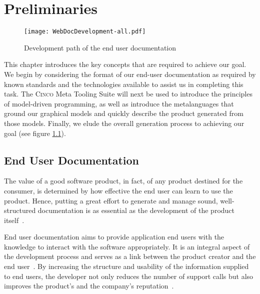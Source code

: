 
\chapter{Preliminaries}\label{ch:Basis}

\begin{figure}[t]
    \centering
    \texttt{[image: WebDocDevelopment-all.pdf]}
    \caption{Development path of the end user documentation}
    \label{fig:procWorkflow}
\end{figure}

This chapter introduces the key concepts that are required to achieve our goal. We begin by considering the format of our end-user documentation as required by known standards and the technologies available to assist us in completing this task. The \textsc{Cinco} Meta Tooling Suite will next be used to introduce the principles of model-driven programming, as well as introduce the metalanguages that ground our graphical models and quickly describe the product generated from those models. Finally, we elude the overall generation process to achieving our goal (see figure \ref{fig:procWorkflow}).

\pagebreak

\section{End User Documentation}\label{sec:endUserDoc}

The value of a good software product, in fact, of any product destined for the consumer, is determined by how effective the end user can learn to use the product. Hence, putting a great effort to generate and manage sound, well-structured documentation is as essential as the development of the product itself~\cite{ISO-IEC-IEEE}. 

End user documentation aims to provide application end users with the knowledge to interact with the software appropriately. It is an integral aspect of the development process and serves as a link between the product creator and the end user~\cite{9238529}. By increasing the structure and usability of the information supplied to end users, the developer not only reduces the number of support calls but also improves the product's and the company's reputation~\cite{ieee5712775}.

